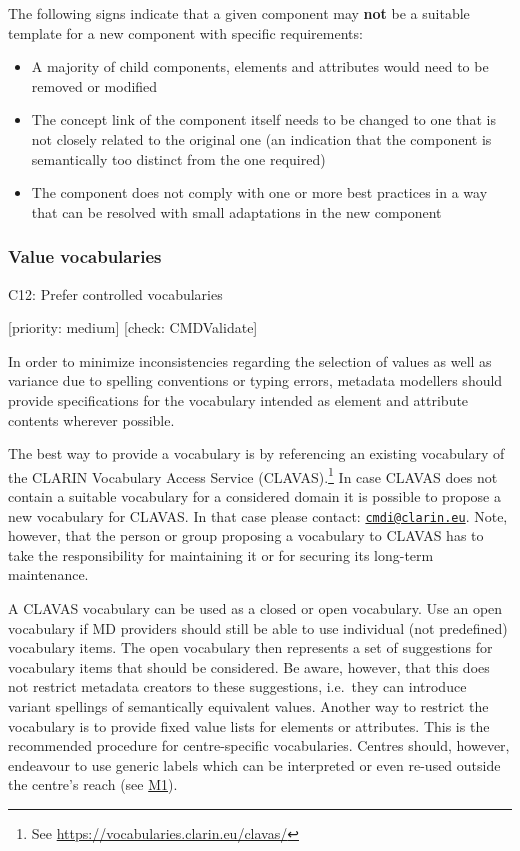 \documentclass[]{article}
\providecommand{\tightlist}{%
  \setlength{\itemsep}{0pt}\setlength{\parskip}{0pt}}
\begin{document}
The following signs indicate that a given component may \textbf{not} be
a suitable template for a new component with specific requirements:

\begin{itemize}
\tightlist
\item
  A majority of child components, elements and attributes would need to
  be removed or modified
\item
  The concept link of the component itself needs to be changed to one
  that is not closely related to the original one (an indication that
  the component is semantically too distinct from the one required)
\item
  The component does not comply with one or more best practices in a way
  that can be resolved with small adaptations in the new component
\end{itemize}

\subsubsection{Value vocabularies}\label{value-vocabularies}

C12: Prefer controlled vocabularies

{[}priority: medium{]} {[}check: CMDValidate{]}

In order to minimize inconsistencies regarding the selection of values
as well as variance due to spelling conventions or typing errors,
metadata modellers should provide specifications for the vocabulary
intended as element and attribute contents wherever possible.

The best way to provide a vocabulary is by referencing an existing
vocabulary of the CLARIN Vocabulary Access Service (CLAVAS).\footnote{See
  \url{https://vocabularies.clarin.eu/clavas/}} In case CLAVAS does not
contain a suitable vocabulary for a considered domain it is possible to
propose a new vocabulary for CLAVAS. In that case please contact:
\href{mailto:cmdi@clarin.eu}{\nolinkurl{cmdi@clarin.eu}}. Note, however,
that the person or group proposing a vocabulary to CLAVAS has to take
the responsibility for maintaining it or for securing its long-term
maintenance.

A CLAVAS vocabulary can be used as a closed or open vocabulary. Use an
open vocabulary if MD providers should still be able to use individual
(not predefined) vocabulary items. The open vocabulary then represents a
set of suggestions for vocabulary items that should be considered. Be
aware, however, that this does not restrict metadata creators to these
suggestions, i.e.~they can introduce variant spellings of semantically
equivalent values. Another way to restrict the vocabulary is to provide
fixed value lists for elements or attributes. This is the recommended
procedure for centre-specific vocabularies. Centres should, however,
endeavour to use generic labels which can be interpreted or even re-used
outside the centre's reach (see
\href{/modelling_component_metadata/README.md\#m1}{M1}).
\end{document}
